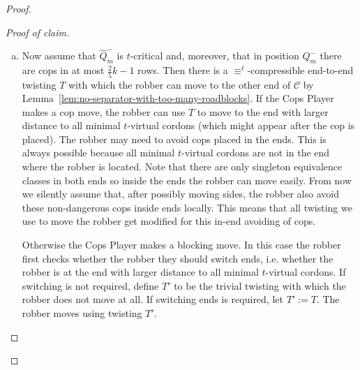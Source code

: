 \documentclass[10pt,a4paper]{article}
\newcommand{\comp}{\equiv}
\newcommand{\grid}{\mathcal{C}}
\newenvironment{claimproof}{\begin{proof}[Proof of claim]}{\end{proof}}
\begin{document}
\begin{proof}
\begin{claimproof}
\begin{enumerate}[(a)]
			This is straightforward to see if the Cops Player makes a cop move.
			We just follow the strategy in the non-blocking game in position $\hat{Q}_m^-$ to ensure this distance~\cite[Proof of Theorem 4.1]{RFJN024}.
			The robber moves to the end with larger distance to all the $t$-virtual cordons. Since different minimal $t$-virtual cordons can have distance at most $O(k)$~\cite{RFJN024},
			one end has distance at least $J/2 - O(k)$ to these $t$-virtual cordons.
			 Otherwise, the Cops Player makes a blocking move.
			Let $N$ be the announced roadblock on a $\comp^t$\nobreakdash-equivalence class $C$. Moreover, imagine that in the non-blocking game a cop is announced for $C$; then the robber responds with some appropriate $\comp^t$\nobreakdash-compressible twisting---which we denote by $T$---according to the robber's strategy. Call the resulting position in the non-blocking game $Q$,
			in which the robber again has distance $O(J)$ to all $t$-virtual cordons.
			The robber moves using $T$ also in the blocking game.
			If $T$ uses $N$ a cop is placed on $C$
			and the resulting position is $Q_{m+1}$.
			 But observe that $\hat{Q}_{m+1}$ is identical to $Q$.
			Otherwise, $T$ avoids $N$. Then a roadblock is placed and 
			again, the resulting position $Q_{m+1}$ is such that $\hat{Q}_{m+1}$ is 
			identical to $Q$.
			
			
			\item Now assume that $\hat{Q}_m^-$ is $t$-critical and, moreover, that
			 in position $Q_m^-$ there are cops in at most $\frac{2}{5}k-1$ rows.
			Then there is a $\comp^t$-compressible end-to-end twisting $T$
			with which the robber can move to the other end of $\grid$
			by Lemma~\ref{lem:no-separator-with-too-many-roadblocks}.
			If the Cops Player makes a cop move,
			the robber can use $T$ to move to the end with larger distance to all minimal $t$-virtual cordons (which might appear after the cop is placed).
			The robber may need to avoid cops placed in the ends.
			This is always possible because all minimal $t$-virtual cordons are not in the end where the robber is located.
			Note that there are only singleton equivalence classes in both ends so inside the ends the robber can move easily.
			From now we silently assume that, after possibly moving sides,
			the robber also avoid these non-dangerous cops inside ends locally.
			This means that all twisting we use to move the robber get modified for this in-end avoiding of cops. 
			
			Otherwise the Cops Player makes a blocking move. In this case
			the robber first checks whether the robber they should switch ends, i.e. whether the robber is at the end with larger distance to all minimal $t$-virtual cordons.
			If switching is not required, 
			define $T'$ to be the trivial twisting with which the robber does not move at all.
			If switching ends is required, let $T' := T$.
			The robber moves using twisting $T'$.
			

\end{enumerate}
\end{claimproof}
\end{proof}
\end{document}
